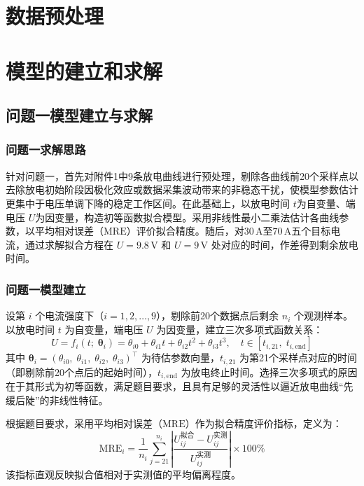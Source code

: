 \documentclass[withoutpreface,bwprint]{cumcmthesis} %
\begin{document}
\section{数据预处理}

\section{模型的建立和求解}
\subsection{问题一模型建立与求解}
\subsubsection{问题一求解思路}
针对问题一，首先对附件1中9条放电曲线进行预处理，剔除各曲线前20个采样点以去除放电初始阶段因极化效应或数据采集波动带来的非稳态干扰，使模型参数估计更集中于电压单调下降的稳定工作区间。在此基础上，以放电时间 $t$为自变量、端电压 $U$为因变量，构造初等函数拟合模型。采用非线性最小二乘法估计各曲线参数，以平均相对误差（$\text{MRE}$）评价拟合精度。随后，对$30\,\text{A}$至$70\,\text{A}$五个目标电流，通过求解拟合方程在 $U=9.8\,\text{V}$ 和 $U=9\,\text{V}$ 处对应的时间，作差得到剩余放电时间。

\subsubsection{问题一模型建立}
设第 $i$ 个电流强度下（$i=1,2,\dots,9$），剔除前20个数据点后剩余 $n_{i}$ 个观测样本。以放电时间 $t$ 为自变量，端电压 $U$ 为因变量，建立三次多项式函数关系：
\begin{equation}
U=f_{i}\left(t;\; \boldsymbol{\theta }_{i}\right)=\theta _{i0}+\theta _{i1}t+\theta _{i2}t^{2}+\theta _{i3}t^{3},\quad t\in \left[t_{i,21},\; t_{i,\text{end}}\right]
\label{eq:fun1}
\end{equation}
其中 $\boldsymbol{\theta }_{i}=\left(\theta _{i0},\; \theta _{i1},\; \theta _{i2},\; \theta _{i3}\right)^{\top }$ 为待估参数向量，$t_{i,21}$ 为第21个采样点对应的时间（即剔除前20个点后的起始时间），$t_{i,\text{end}}$ 为放电终止时间。选择三次多项式的原因在于其形式为初等函数，满足题目要求，且具有足够的灵活性以逼近放电曲线“先缓后陡”的非线性特征。

根据题目要求，采用平均相对误差（$\text{MRE}$）作为拟合精度评价指标，定义为：
\begin{equation}
\text{MRE}_{i}=\frac{1}{n_{i}}\sum_{j=21}^{n_{i}} \left| \frac{U_{ij}^{\text{拟合}}-U_{ij}^{\text{实测}}}{U_{ij}^{\text{实测}}}\right| \times 100\%
\label{eq:MRE}
\end{equation}
该指标直观反映拟合值相对于实测值的平均偏离程度。
\end{document}
